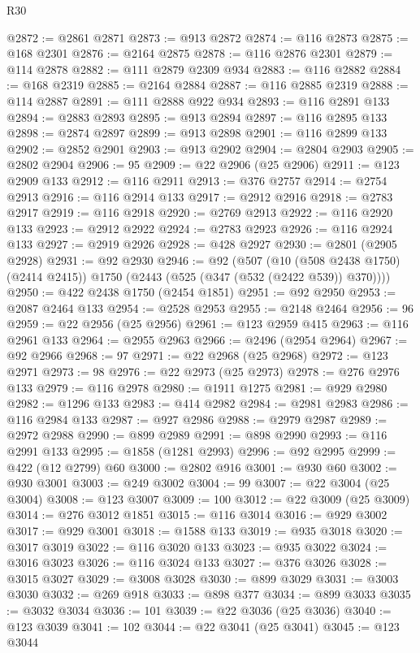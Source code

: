 \begin{lexlean}{R30}
\begin{coremodule}
@2872 := @2861 @2871
@2873 := @913 @2872
@2874 := @116 @2873
@2875 := @168 @2301
@2876 := @2164 @2875
@2878 := @116 @2876 @2301
@2879 := @114 @2878
@2882 := @111 @2879 @2309 @934
@2883 := @116 @2882
@2884 := @168 @2319
@2885 := @2164 @2884
@2887 := @116 @2885 @2319
@2888 := @114 @2887
@2891 := @111 @2888 @922 @934
@2893 := @116 @2891 @133
@2894 := @2883 @2893
@2895 := @913 @2894
@2897 := @116 @2895 @133
@2898 := @2874 @2897
@2899 := @913 @2898
@2901 := @116 @2899 @133
@2902 := @2852 @2901
@2903 := @913 @2902
@2904 := @2804 @2903
@2905 := @2802 @2904
@2906 := 95
@2909 := @22 @2906 (@25 @2906)
@2911 := @123 @2909 @133
@2912 := @116 @2911
@2913 := @376 @2757
@2914 := @2754 @2913
@2916 := @116 @2914 @133
@2917 := @2912 @2916
@2918 := @2783 @2917
@2919 := @116 @2918
@2920 := @2769 @2913
@2922 := @116 @2920 @133
@2923 := @2912 @2922
@2924 := @2783 @2923
@2926 := @116 @2924 @133
@2927 := @2919 @2926
@2928 := @428 @2927
@2930 := @2801 (@2905 @2928)
@2931 := @92 @2930
@2946 := @92
    (@507
      (@10 (@508 @2438 @1750) (@2414 @2415))
      @1750
      (@2443 (@525 (@347 (@532 (@2422 @539)) @370))))
@2950 := @422 @2438 @1750 (@2454 @1851)
@2951 := @92 @2950
@2953 := @2087 @2464 @133
@2954 := @2528 @2953
@2955 := @2148 @2464
@2956 := 96
@2959 := @22 @2956 (@25 @2956)
@2961 := @123 @2959 @415
@2963 := @116 @2961 @133
@2964 := @2955 @2963
@2966 := @2496 (@2954 @2964)
@2967 := @92 @2966
@2968 := 97
@2971 := @22 @2968 (@25 @2968)
@2972 := @123 @2971
@2973 := 98
@2976 := @22 @2973 (@25 @2973)
@2978 := @276 @2976 @133
@2979 := @116 @2978
@2980 := @1911 @1275
@2981 := @929 @2980
@2982 := @1296 @133
@2983 := @414 @2982
@2984 := @2981 @2983
@2986 := @116 @2984 @133
@2987 := @927 @2986
@2988 := @2979 @2987
@2989 := @2972 @2988
@2990 := @899 @2989
@2991 := @898 @2990
@2993 := @116 @2991 @133
@2995 := @1858 (@1281 @2993)
@2996 := @92 @2995
@2999 := @422 (@12 @2799) @60
@3000 := @2802 @916
@3001 := @930 @60
@3002 := @930 @3001
@3003 := @249 @3002
@3004 := 99
@3007 := @22 @3004 (@25 @3004)
@3008 := @123 @3007
@3009 := 100
@3012 := @22 @3009 (@25 @3009)
@3014 := @276 @3012 @1851
@3015 := @116 @3014
@3016 := @929 @3002
@3017 := @929 @3001
@3018 := @1588 @133
@3019 := @935 @3018
@3020 := @3017 @3019
@3022 := @116 @3020 @133
@3023 := @935 @3022
@3024 := @3016 @3023
@3026 := @116 @3024 @133
@3027 := @376 @3026
@3028 := @3015 @3027
@3029 := @3008 @3028
@3030 := @899 @3029
@3031 := @3003 @3030
@3032 := @269 @918
@3033 := @898 @377
@3034 := @899 @3033
@3035 := @3032 @3034
@3036 := 101
@3039 := @22 @3036 (@25 @3036)
@3040 := @123 @3039
@3041 := 102
@3044 := @22 @3041 (@25 @3041)
@3045 := @123 @3044

\end{coremodule}
\end{lexlean}
